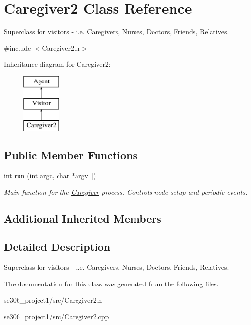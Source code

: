 \hypertarget{classCaregiver2}{\section{Caregiver2 Class Reference}
\label{classCaregiver2}
}


Superclass for visitors -\/ i.\-e. Caregivers, Nurses, Doctors, Friends, Relatives.  




{\ttfamily \#include $<$Caregiver2.\-h$>$}

Inheritance diagram for Caregiver2\-:\begin{figure}[H]
\begin{center}
\leavevmode
\includegraphics[height=3.000000cm]{classCaregiver2}
\end{center}
\end{figure}
\subsection*{Public Member Functions}
\begin{DoxyCompactItemize}
\item 
\hypertarget{classCaregiver2_a65af1d2308e093124b79c53ba43120d3}{int \hyperlink{classCaregiver2_a65af1d2308e093124b79c53ba43120d3}{run} (int argc, char $\ast$argv\mbox{[}$\,$\mbox{]})}\label{classCaregiver2_a65af1d2308e093124b79c53ba43120d3}

\begin{DoxyCompactList}\small\item\em Main function for the \hyperlink{classCaregiver}{Caregiver} process. Controls node setup and periodic events. \end{DoxyCompactList}\end{DoxyCompactItemize}
\subsection*{Additional Inherited Members}


\subsection{Detailed Description}
Superclass for visitors -\/ i.\-e. Caregivers, Nurses, Doctors, Friends, Relatives. 

The documentation for this class was generated from the following files\-:\begin{DoxyCompactItemize}
\item 
se306\-\_\-project1/src/Caregiver2.\-h\item 
se306\-\_\-project1/src/Caregiver2.\-cpp\end{DoxyCompactItemize}
